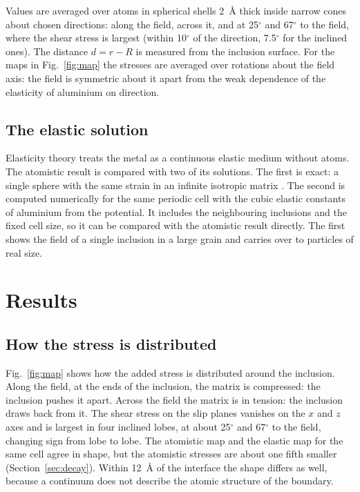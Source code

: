 \documentclass[11pt,a4paper]{article}
\begin{document}
Values are averaged over atoms in spherical shells 2~\AA{} thick inside
narrow cones about chosen directions: along the field, across it, and at
25$^\circ$ and 67$^\circ$ to the field, where the shear stress is largest
(within 10$^\circ$ of the direction, 7.5$^\circ$ for the inclined ones). The
distance $d=r-R$ is measured from the inclusion surface. For the maps in
Fig.~\ref{fig:map} the stresses are averaged over rotations about the field
axis: the field is symmetric about it apart from the weak dependence of the
elasticity of aluminium on direction.

\subsection{The elastic solution}

Elasticity theory treats the metal as a continuous elastic medium without
atoms. The atomistic result is compared with two of its solutions. The first
is exact: a single sphere with the same strain in an infinite isotropic
matrix \cite{Eshelby1957,Mura1987,JuSun1999}. The second is computed
numerically for the same periodic cell \cite{MoulinecSuquet1998} with the
cubic elastic constants of aluminium from the potential. It includes the
neighbouring inclusions and the fixed cell size, so it can be compared with
the atomistic result directly. The first shows the field of a single
inclusion in a large grain and carries over to particles of real size.

\section{Results}

\subsection{How the stress is distributed}

Fig.~\ref{fig:map} shows how the added stress is distributed around the
inclusion. Along the field, at the ends of the inclusion, the matrix is
compressed: the inclusion pushes it apart. Across the field the matrix is in
tension: the inclusion draws back from it. The shear stress on the slip planes
vanishes on the $x$ and $z$ axes and is largest in four inclined lobes, at
about 25$^\circ$ and 67$^\circ$ to the field, changing sign from lobe to lobe.
The atomistic map and the elastic map for the same cell agree in shape, but
the atomistic stresses are about one fifth smaller
(Section~\ref{sec:decay}). Within 12~\AA{} of the interface the shape
differs as well, because a continuum does not describe the atomic structure
of the boundary.
\end{document}
